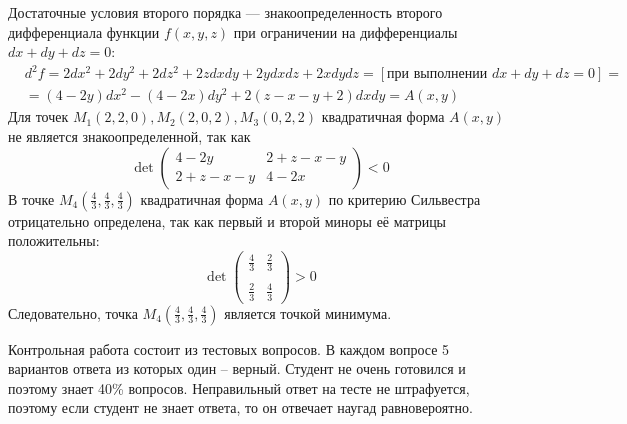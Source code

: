 \documentclass[addpoints, answers]{exam} %
\begin{document}
\begin{questions}
\begin{parts}
\begin{solution}
Достаточные условия второго порядка --- знакоопределенность второго дифференциала функции $f(x,y,z)$ при ограничении на дифференциалы $dx+dy+dz=0$:
\begin{eqnarray}
&d^2 f=2dx^2+2d y^2+2d z^2+2zdxdy+2ydxdz+2xdydz=[\textit{при выполнении }  dx+dy+dz=0]=\\
&=(4-2y)dx^2-(4-2x)dy^2+2(z-x-y+2)dxdy=A(x,y)
\end{eqnarray}
Для точек $M_1(2,2,0), M_2(2,0,2), M_3(0,2,2)$ квадратичная форма $A(x,y)$ не является знакоопределенной, так как
\[
\det \left(\begin{array}{cc}
4-2y & 2+z-x-y\\
2+z-x-y & 4-2x
\end{array}\right) <0
\]
В точке $M_4(\frac{4}{3},\frac{4}{3},\frac{4}{3})$ квадратичная форма $A(x,y)$ по критерию Сильвестра отрицательно определена, так как первый и второй миноры её матрицы положительны:
\[
\det \left(\begin{array}{cc}
\frac{4}{3} & \frac{2}{3}\\\\
\frac{2}{3} & \frac{4}{3}
\end{array}\right)>0
\]
Следовательно, точка $M_4(\frac{4}{3},\frac{4}{3},\frac{4}{3})$ является точкой минимума.\\
\end{solution}

\end{parts}
\question Контрольная работа состоит из тестовых вопросов. В каждом вопросе 5 вариантов ответа из которых один – верный. Студент не очень готовился и поэтому знает 40\% вопросов. Неправильный ответ на тесте не штрафуется, поэтому если студент не знает ответа, то он отвечает наугад равновероятно.
\end{questions}
\end{document}

